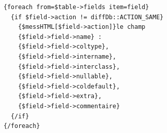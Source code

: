 \begin{lstlisting}[basicstyle=\ttfamily\small, frame=trBL]
{foreach from=$table->fields item=field}
  {if $field->action != diffDb::ACTION_SAME}
    {$messHTML[$field->action]}le champ
    {$field->field->name} :
    {$field->field->coltype},
    {$field->field->intername},
    {$field->field->interclass},
    {$field->field->nullable},
    {$field->field->coldefault},
    {$field->field->extra},
    {$field->field->commentaire}
  {/if}
{/foreach}
\end{lstlisting}
